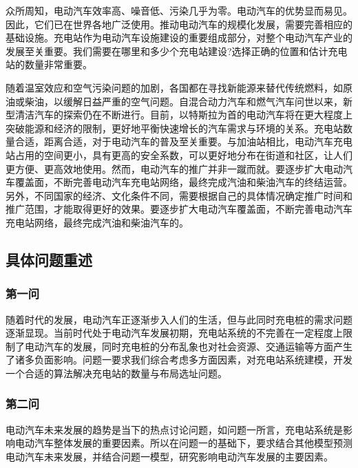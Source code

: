 \documentclass[12pt, a4paper, oneside]{ctexart}
\begin{document}
众所周知，电动汽车效率高、噪音低、污染几乎为零。电动汽车的优势显而易见。因此，它们已在世界各地广泛使用。推动电动汽车的规模化发展，需要完善相应的基础设施。充电站作为电动汽车设施建设的重要组成部分，对整个电动汽车产业的发展至关重要。我们需要在哪里和多少个充电站建设?选择正确的位置和估计充电站的数量非常重要。

随着温室效应和空气污染问题的加剧，各国都在寻找新能源来替代传统燃料，如原油或柴油，以缓解日益严重的空气问题。自混合动力汽车和燃气汽车问世以来，新型清洁汽车的探索仍在不断进行。目前，以特斯拉为首的电动汽车将在更大程度上突破能源和经济的限制，更好地平衡快速增长的汽车需求与环境的关系。充电站数量合适，距离合适，对于电动汽车的普及至关重要。与加油站相比，电动汽车充电站占用的空间更小，具有更高的安全系数，可以更好地分布在街道和社区，让人们更方便、更高效地使用。然而，电动汽车的推广并非一蹴而就。要逐步扩大电动汽车覆盖面，不断完善电动汽车充电站网络，最终完成汽油和柴油汽车的终结运营。另外，不同国家的经济、文化条件不同，需要根据自己的具体情况确定推广时间和推广范围，才能取得更好的效果。要逐步扩大电动汽车覆盖面，不断完善电动汽车充电站网络，最终完成汽油和柴油汽车的。
\subsection{具体问题重述}
\subsubsection{第一问}
随着时代的发展，电动汽车正逐渐步入人们的生活，但与此同时充电桩的需求问题逐渐显现。当前时代处于电动汽车发展初期，充电站系统的不完善在一定程度上限制了电动汽车的发展，同时充电桩的分布乱象也对社会资源、交通运输等方面产生了诸多负面影响。问题一要求我们综合考虑多方面因素，对充电站系统建模，开发一个合适的算法解决充电站的数量与布局选址问题。

\subsubsection{第二问}
电动汽车未来发展的趋势是当下的热点讨论问题，如问题一所言，充电站系统是影响电动汽车整体发展的重要因素。所以在问题一的基础下，要求结合其他模型预测电动汽车未来发展，并结合问题一模型，研究影响电动汽车发展的主要因素。
\end{document}
